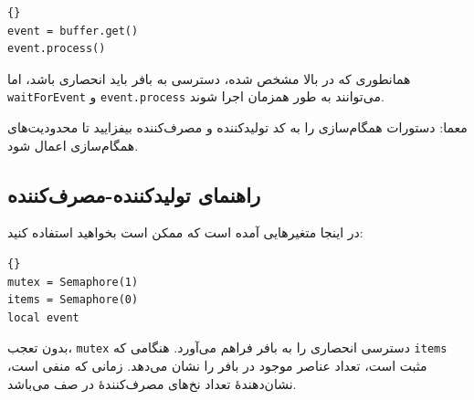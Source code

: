 \documentclass{book}
\newcommand{\clearemptydoublepage}{\newpage\cleardoublepage}
\begin{document}
\begin{latin}
\begin{latin}
\begin{lstlisting}[title=\rl{کد پایه مصرف‌کننده}]{}
event = buffer.get()
event.process()
\end{lstlisting}
\end{latin}
\end{latin}

    همانطوری که در بالا مشخص شده، دسترسی به بافر باید انحصاری باشد، 
    اما {\tt waitForEvent} و {\tt event.process} می‌توانند به طور همزمان اجرا شوند.
    

    معما: دستورات همگام‌سازی را به کد تولید‌کننده و مصرف‌کننده بیفزایید تا محدودیت‌های همگام‌سازی اعمال شود.

\clearemptydoublepage
\subsection{راهنمای تولیدکننده-مصرف‌کننده}

    در اینجا متغیرهایی آمده است که ممکن است بخواهید استفاده کنید:

\begin{latin}
\begin{latin}
\begin{lstlisting}[title={Producer-consumer initialization}]{}
mutex = Semaphore(1)
items = Semaphore(0)
local event
\end{lstlisting}
\end{latin}
\end{latin}


    بدون تعجب، {\tt mutex} دسترسی انحصاری را به بافر فراهم می‌آورد. 
    هنگامی که {\tt items} مثبت است، تعداد عناصر موجود در بافر را نشان می‌دهد. 
    زمانی که منفی است، نشان‌دهندهٔ تعداد نخ‌های مصرف‌کنندهٔ در صف می‌باشد. 
\end{document}
